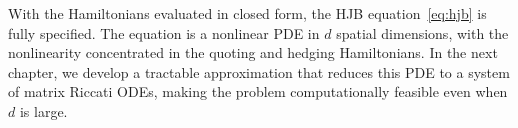 \bigskip

With the Hamiltonians evaluated in closed form, the HJB equation~\eqref{eq:hjb} is fully specified. The equation is a nonlinear PDE in $d$ spatial dimensions, with the nonlinearity concentrated in the quoting and hedging Hamiltonians. In the next chapter, we develop a tractable approximation that reduces this PDE to a system of matrix Riccati ODEs, making the problem computationally feasible even when $d$ is large.
